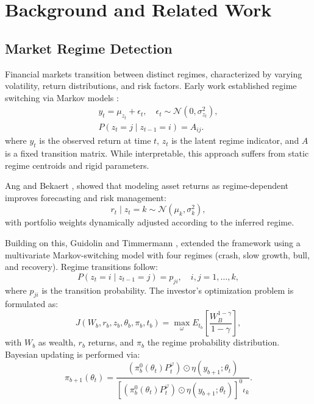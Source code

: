 \documentclass[conference,10pt]{IEEEtran}
\begin{document}
\section{Background and Related Work} \label{sec2}

\subsection{Market Regime Detection} 

Financial markets transition between distinct regimes, characterized by varying volatility, return distributions, and risk factors. Early work established regime switching via Markov models \cite{hamilton1989new}:
\begin{gather}
y_t = \mu_{z_t} + \epsilon_t, \quad \epsilon_t \sim \mathcal{N}(0, \sigma^2_{z_t}), \\
P(z_t = j \mid z_{t-1} = i) = A_{ij}.
\end{gather}
where \( y_t \) is the observed return at time \( t \), \( z_t \) is the latent regime indicator, and \( A \) is a fixed transition matrix. While interpretable, this approach suffers from static regime centroids and rigid parameters.

Ang and Bekaert \cite{ang2002international}, showed that modeling asset returns as regime-dependent improves forecasting and risk management:
\begin{equation}
r_t \mid z_t = k \sim \mathcal{N}(\mu_k, \sigma_k^2),
\end{equation}
with portfolio weights dynamically adjusted according to the inferred regime.

Building on this, Guidolin and Timmermann \cite{guidolin2007asset}, extended the framework using a multivariate Markov-switching model with four regimes (crash, slow growth, bull, and recovery). Regime transitions follow:
\begin{equation}
P(z_t = i \mid z_{t-1} = j) = p_{ji}, \quad i, j = 1, \dots, k,
\end{equation}
where \( p_{ji} \) is the transition probability. The investor's optimization problem is formulated as:
\begin{equation}
J(W_b, r_b, z_b, \theta_b, \pi_b, t_b) = \max_{\omega} E_{t_b} \left[ \frac{W_B^{1-\gamma}}{1-\gamma} \right],
\end{equation}
with \( W_b \) as wealth, \( r_b \) returns, and \( \pi_b \) the regime probability distribution. Bayesian updating is performed via:
\begin{equation}
\pi_{b+1}(\theta_t) = \frac{(\pi_b^0(\theta_t) P_t^\varphi) \odot \eta(y_{b+1}; \theta_t)}{[(\pi_b^0(\theta_t) P_t^\varphi) \odot \eta(y_{b+1}; \theta_t)]^0 \iota_k}.
\end{equation}
\end{document}
